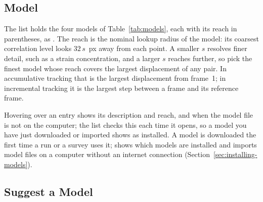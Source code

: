 \subsection{Model}
\label{sec:workflow-model}

The  list holds the four models of Table~\ref{tab:models}, each with its reach in
parentheses, as . The reach is the nominal lookup radius of the model:
its coarsest correlation level looks $32\,s$~px away from each point. A smaller $s$ resolves finer
detail, such as a strain concentration, and a larger $s$ reaches further, so pick the finest model
whose reach covers the largest displacement of any pair. In accumulative tracking that is the
largest displacement from frame~1; in incremental tracking it is the largest step between a frame
and its reference frame.

Hovering over an entry shows its description and reach, and  when the
model file is not on the computer; the list checks this each time it opens, so a model you have
just downloaded or imported shows as installed. A model is downloaded the first time a run or a survey
uses it;  shows which models are installed and imports model files on a
computer without an internet connection (Section~\ref{sec:installing-models}).

\subsection{Suggest a Model}
\label{sec:suggest}

